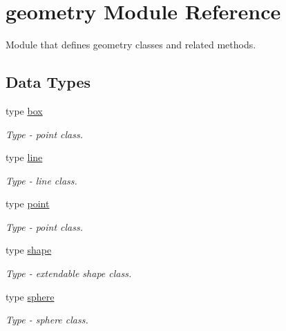 \hypertarget{namespacegeometry}{}\section{geometry Module Reference}
\label{namespacegeometry}


Module that defines geometry classes and related methods.  


\subsection*{Data Types}
\begin{DoxyCompactItemize}
\item 
type \hyperlink{structgeometry_1_1box}{box}
\begin{DoxyCompactList}\small\item\em Type -\/ point class. \end{DoxyCompactList}\item 
type \hyperlink{structgeometry_1_1line}{line}
\begin{DoxyCompactList}\small\item\em Type -\/ line class. \end{DoxyCompactList}\item 
type \hyperlink{structgeometry_1_1point}{point}
\begin{DoxyCompactList}\small\item\em Type -\/ point class. \end{DoxyCompactList}\item 
type \hyperlink{structgeometry_1_1shape}{shape}
\begin{DoxyCompactList}\small\item\em Type -\/ extendable shape class. \end{DoxyCompactList}\item 
type \hyperlink{structgeometry_1_1sphere}{sphere}
\begin{DoxyCompactList}\small\item\em Type -\/ sphere class. \end{DoxyCompactList}\end{DoxyCompactItemize}
